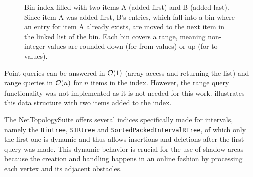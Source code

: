\begin{figure}[h]
\begin{figcenter}
			\end{figcenter}
			\caption[BinIndex example with two inserted items.]{Bin index filled with two items A (added first) and B (added last). Since item A was added first, B's entries, which fall into a bin where an entry for item A already exists, are moved to the next item in the linked list of the bin. Each bin covers a range, meaning non-integer values are rounded down (for from-values) or up (for to-values).}
			\label{fig:bin-index}
		\end{figure}
		
		Point queries can be answered in $\mathcal{O}(1)$ (array access and returning the list) and range queries in $\mathcal{O}(n)$ for $n$ items in the index.
		However, the range query functionality was not implemented as it is not needed for this work.
		 illustrates this data structure with two items added to the index.
		
		The NetTopologySuite offers several indices specifically made for intervals, namely the \texttt{Bintree}, \texttt{SIRtree} and \texttt{SortedPackedIntervalRTree}, of which only the first one is dynamic and thus allows insertions and deletions after the first query was made.
		This dynamic behavior is crucial for the use of shadow areas because the creation and handling happens in an online fashion by processing each vertex and its adjacent obstacles.
		
